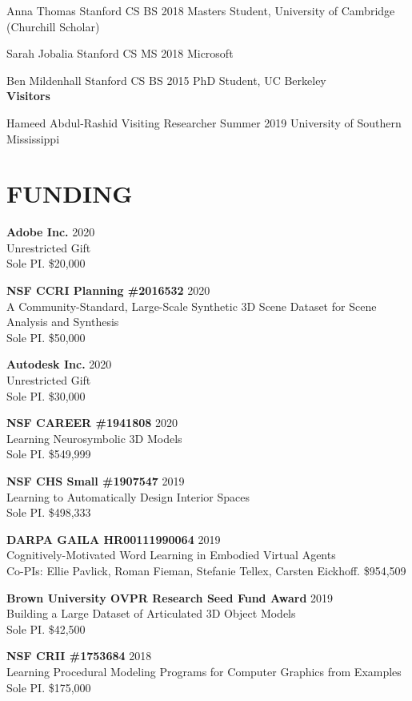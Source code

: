 \documentclass[line,margin]{res}
\begin{document}
\begin{resume}
\alumni
{Anna Thomas}
{Stanford CS BS}
{2018}
{Masters Student, University of Cambridge (Churchill Scholar)}

\alumni
{Sarah Jobalia}
{Stanford CS MS}
{2018}
{Microsoft}

\alumni
{Ben Mildenhall}
{Stanford CS BS}
{2015}
{PhD Student, UC Berkeley}
\\


\textbf{Visitors}

\visitor
{Hameed Abdul-Rashid}
{Visiting Researcher}
{Summer 2019}
{University of Southern Mississippi}


\section{FUNDING}

\newcommand{\funding}[5] {
	\textbf{#1} \hfill #5\\
	#2 \\
	#3. #4
}

\funding
{Adobe Inc.}
{Unrestricted Gift}
{Sole PI}
{\$20,000}
{2020}

\funding
{NSF CCRI Planning \#2016532}
{A Community-Standard, Large-Scale Synthetic 3D Scene Dataset for Scene Analysis and Synthesis}
{Sole PI}
{\$50,000}
{2020}

\funding
{Autodesk Inc.}
{Unrestricted Gift}
{Sole PI}
{\$30,000}
{2020}

\funding
{NSF CAREER \#1941808}
{Learning Neurosymbolic 3D Models}
{Sole PI}
{\$549,999}
{2020}

\funding
{NSF CHS Small \#1907547}
{Learning to Automatically Design Interior Spaces}
{Sole PI}
{\$498,333}
{2019}

\funding
{DARPA GAILA HR00111990064}
{Cognitively-Motivated Word Learning in Embodied Virtual Agents}
{Co-PIs: Ellie Pavlick, Roman Fieman, Stefanie Tellex, Carsten Eickhoff}
{\$954,509}
{2019}

\funding
{Brown University OVPR Research Seed Fund Award}
{Building a Large Dataset of Articulated 3D Object Models}
{Sole PI}
{\$42,500}
{2019}

\funding
{NSF CRII \#1753684}
{Learning Procedural Modeling Programs for Computer Graphics from Examples}
{Sole PI}
{\$175,000}
{2018}



\end{resume}
\end{document}
